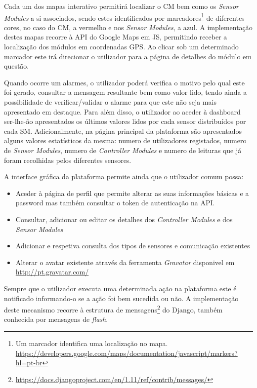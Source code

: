 Cada um dos mapas interativo permitirá localizar o \acl{CM} bem como os \textit{Sensor Modules} a si associados, sendo estes identificados por marcadores\footnote{Um marcador identifica uma localização no mapa. \\ \url{https://developers.google.com/maps/documentation/javascript/markers?hl=pt-br}} de diferentes cores, no caso do \acl{CM}, a vermelho e nos \textit{Sensor Modules}, a azul. A implementação destes mapas recorre à \ac{API} do Google Maps em \ac{JS}, permitindo receber a localização dos módulos em coordenadas \ac{GPS}. Ao clicar sob um determinado marcador este irá direcionar o utilizador para a página de detalhes do módulo em questão. 


Quando ocorre um  alarmes, o utilizador poderá verifica o motivo pelo qual este foi gerado, consultar a mensagem resultante bem como valor lido, tendo ainda a possibilidade de verificar/validar o alarme para que este não seja mais apresentado em destaque. Para além disso, o utilizador ao aceder à dashboard ser-lhe-ão apresentados os últimos valores lidos por cada sensor distribuídos por cada \acl{SM}. Adicionalmente, na página principal da plataforma são apresentados alguns valores estatísticos da mesma: numero de utilizadores registados, numero de \textit{Sensor Modules}, numero de \textit{Controller Modules} e numero de leituras que já foram recolhidas pelos diferentes sensores. 


A interface gráfica da plataforma permite ainda que o utilizador comum possa: 

\begin{itemize}
	\item Aceder à página de perfil que permite alterar as suas informações básicas e a password mas também consultar o token de autenticação na API. 
	
	\item Consultar, adicionar ou editar os detalhes dos \textit{Controller Modules} e dos \textit{Sensor Modules}
	
	\item Adicionar e respetiva consulta dos tipos de sensores e comunicação existentes
	
	\item Alterar o avatar existente através da ferramenta \textit{Gravatar} disponivel em \url{http://pt.gravatar.com/} 
\end{itemize}






Sempre que o utilizador executa uma determinada ação na plataforma este é notificado informando-o se a ação foi bem sucedida ou não. A implementação deste mecanismo recorre à estrutura de mensagens\footnote{\url{https://docs.djangoproject.com/en/1.11/ref/contrib/messages/}} do Django, também conhecida por mensagens de \textit{flash}. 




